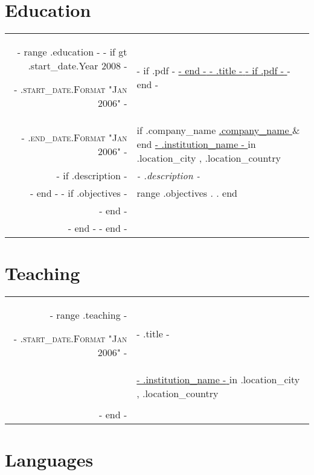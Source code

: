 \section{Education}
\begin{tabular}{r|p{15cm}}
    {{- range .education -}}
    {{- if gt .start_date.Year 2008 -}}

    \textsc{ {{- .start_date.Format "Jan 2006" -}} } & {{- if .pdf -}} \href{ {{- .pdf -}} }{ {{- end -}} {{- .title -}} {{- if .pdf -}} } {{- end -}}                                                                                                            \\
    \textsc{ {{- .end_date.Format "Jan 2006" -}} }   & {{ if .company_name }} \href{ {{- .company_url -}} } { {{ .company_name }} } \& {{ end }} \href{ {{- .institution_url -}} } { {{- .institution_name -}} } in {{ .location_city }}, {{ .location_country }} \\
    {{- if .description -}}                          & \emph{ {{- .description -}} }                                                                                                                                                                              \\ {{- end -}}
    {{- if .objectives -}}                           & \footnotesize{ {{ range .objectives }} {{ . }}. {{ end }} }                                                                                                                                                \\ {{- end -}}
    \multicolumn{2}{c}{}                                                                                                                                                                                                                                          \\

    {{- end -}}
    {{- end -}}
\end{tabular}

\section{Teaching}
\begin{tabular}{r|p{15cm}}
    {{- range .teaching -}}

    \textsc{ {{- .start_date.Format "Jan 2006" -}} } & {{- .title -}}                                                                                                  \\
                                                     & \href{ {{- .institution_url -}} }{ {{- .institution_name -}} } in {{ .location_city }}, {{ .location_country }} \\
    \multicolumn{2}{c}{}                                                                                                                                               \\

    {{- end -}}
\end{tabular}

\section{Languages}
